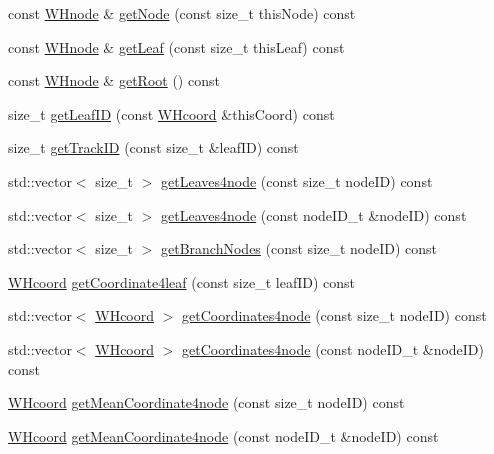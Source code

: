 \begin{DoxyCompactItemize}
const \hyperlink{classWHnode}{\-W\-Hnode} \& \hyperlink{classWHtree_a58a274bacff561739374ed95ed74488f}{get\-Node} (const size\-\_\-t this\-Node) const 
\item 
const \hyperlink{classWHnode}{\-W\-Hnode} \& \hyperlink{classWHtree_adc212da2ed903705afac40d96975cc7e}{get\-Leaf} (const size\-\_\-t this\-Leaf) const 
\item 
const \hyperlink{classWHnode}{\-W\-Hnode} \& \hyperlink{classWHtree_a53a4524bb216e0d320fdb5c98ec2c717}{get\-Root} () const 
\item 
size\-\_\-t \hyperlink{classWHtree_a335e5ee61ee857d9da6fbd960393c109}{get\-Leaf\-I\-D} (const \hyperlink{classWHcoord}{\-W\-Hcoord} \&this\-Coord) const 
\item 
size\-\_\-t \hyperlink{classWHtree_ab9237eac7db43b60db0ebe343bcba641}{get\-Track\-I\-D} (const size\-\_\-t \&leaf\-I\-D) const 
\item 
std\-::vector$<$ size\-\_\-t $>$ \hyperlink{classWHtree_a0f9a23021c60b6bc72839852d51e4203}{get\-Leaves4node} (const size\-\_\-t node\-I\-D) const 
\item 
std\-::vector$<$ size\-\_\-t $>$ \hyperlink{classWHtree_a0768aa45b66453ef9689ce9b27a11038}{get\-Leaves4node} (const node\-I\-D\-\_\-t \&node\-I\-D) const 
\item 
std\-::vector$<$ size\-\_\-t $>$ \hyperlink{classWHtree_a50bc334e9b71cdc3c9821c5decad58b5}{get\-Branch\-Nodes} (const size\-\_\-t node\-I\-D) const 
\item 
\hyperlink{classWHcoord}{\-W\-Hcoord} \hyperlink{classWHtree_a8550437c85a1c9d8ff5726e45044eef1}{get\-Coordinate4leaf} (const size\-\_\-t leaf\-I\-D) const 
\item 
std\-::vector$<$ \hyperlink{classWHcoord}{\-W\-Hcoord} $>$ \hyperlink{classWHtree_af31b8dd9b39669b0969b5d06390652dc}{get\-Coordinates4node} (const size\-\_\-t node\-I\-D) const 
\item 
std\-::vector$<$ \hyperlink{classWHcoord}{\-W\-Hcoord} $>$ \hyperlink{classWHtree_abefe13898e516410826ec105c1af211e}{get\-Coordinates4node} (const node\-I\-D\-\_\-t \&node\-I\-D) const 
\item 
\hyperlink{classWHcoord}{\-W\-Hcoord} \hyperlink{classWHtree_ae17b1e3c712515baf55ac5ba4cdb0e29}{get\-Mean\-Coordinate4node} (const size\-\_\-t node\-I\-D) const 
\item 
\hyperlink{classWHcoord}{\-W\-Hcoord} \hyperlink{classWHtree_a211df0613a8e94addb903df8217b4b16}{get\-Mean\-Coordinate4node} (const node\-I\-D\-\_\-t \&node\-I\-D) const 
\item 

\end{DoxyCompactItemize}
